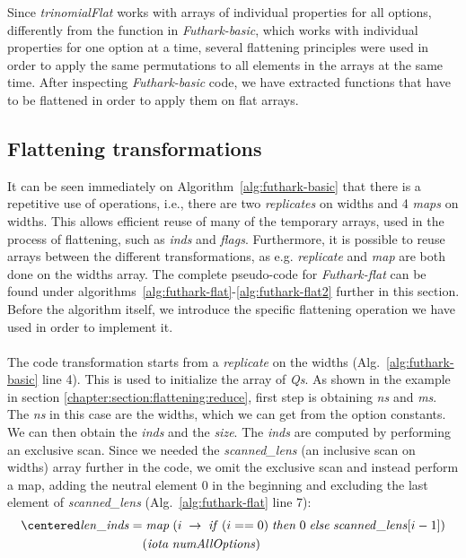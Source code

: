 Since \textit{trinomialFlat} works with arrays of individual properties for all options, differently from the function in \textit{Futhark-basic}, which works with individual properties for one option at a time, several flattening principles were used in order to apply the same permutations to all elements in the arrays at the same time. After inspecting \textit{Futhark-basic} code, we have extracted functions that have to be flattened in order to apply them on flat arrays.

\subsection*{Flattening transformations}
It can be seen immediately on Algorithm~\ref{alg:futhark-basic} that there is a repetitive use of operations, i.e., there are two \textit{replicates} on widths and 4 \textit{maps} on widths. This allows efficient reuse of many of the temporary arrays, used in the process of flattening, such as \textit{inds} and \textit{flags}. Furthermore, it is possible to reuse arrays between the different transformations, as e.g. \textit{replicate} and \textit{map} are both done on the widths array. The complete pseudo-code for \textit{Futhark-flat} can be found under algorithms~\ref{alg:futhark-flat}-\ref{alg:futhark-flat2} further in this section. Before the algorithm itself, we introduce the specific flattening operation we have used in order to implement it.
\\\\
The code transformation starts from a \textit{replicate} on the widths (Alg.~\ref{alg:futhark-basic} line 4). This is used to initialize the array of \textit{Qs}. As shown in the example in section \ref{chapter:section:flattening:reduce}, first step is obtaining \textit{ns} and \textit{ms}. The \textit{ns} in this case are the widths, which we can get from the option constants. We can then obtain the \textit{inds} and the \textit{size}. The \textit{inds} are computed by performing an exclusive scan. Since we needed the \textit{scanned\_lens} (an inclusive scan on widths) array further in the code, we omit the exclusive scan and instead perform a map, adding the neutral element 0 in the beginning and excluding the last element of \textit{scanned\_lens} (Alg.~\ref{alg:futhark-flat} line 7):
\begin{align}
\centered
\nonumber
\mathit{len\_inds} = &\;\mathit{map}\;(i\;\rightarrow\;\mathit{if}\;(i==0)\; \mathit{then}\;0\;\mathit{else}\;\mathit{scanned\_lens}[i-1])\\\nonumber
&(\mathit{iota}\;\mathit{numAllOptions})
\end{align}
